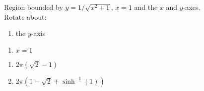{Region bounded by $y=1/\sqrt{x^2+1}$, $x=1$ and the $x$ and $y$-axes.\\
Rotate about:\\
\begin{minipage}[t]{.5\linewidth}
\begin{enumerate}
\item		the $y$-axis
\end{enumerate}
\end{minipage}%
\begin{minipage}[t]{.5\linewidth}
\begin{enumerate}\addtocounter{enumii}{1}
\item		$x=1$
\end{enumerate}
\end{minipage}
}
{\begin{enumerate}
\item $2\pi(\sqrt{2}-1)$
\item $2\pi(1-\sqrt{2}+\sinh^{-1} (1))$
\end{enumerate}
}
